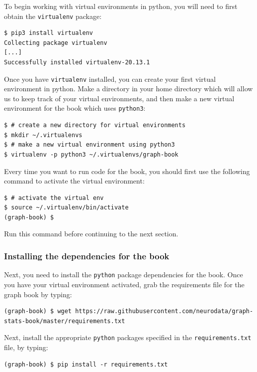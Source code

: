 To begin working with virtual environments in python, you will need to first obtain the \texttt{virtualenv} package:

\begin{lstlisting}[style=bash]
$ pip3 install virtualenv
Collecting package virtualenv
[...]
Successfully installed virtualenv-20.13.1
\end{lstlisting}

Once you have \texttt{virtualenv} installed, you can create your first virtual environment in python. Make a directory in your home directory which will allow us to keep track of your virtual environments, and then make a new virtual environment for the book which uses \texttt{python3}:

\begin{lstlisting}[style=bash]
$ # create a new directory for virtual environments
$ mkdir ~/.virtualenvs
$ # make a new virtual environment using python3
$ virtualenv -p python3 ~/.virtualenvs/graph-book
\end{lstlisting}

Every time you want to run code for the book, you should first use the following command to activate the virtual environment:

\begin{lstlisting}[style=bash]
$ # activate the virtual env
$ source ~/.virtualenv/bin/activate
(graph-book) $ 
\end{lstlisting}

Run this command before continuing to the next section.

\subsubsection*{Installing the dependencies for the book}

Next, you need to install the \texttt{python} package dependencies for the book. Once you have your virtual environment activated, grab the requirements file for the graph book by typing:


\begin{lstlisting}[style=bash]
(graph-book) $ wget https://raw.githubusercontent.com/neurodata/graph-stats-book/master/requirements.txt
\end{lstlisting}

Next, install the appropriate \texttt{python} packages specified in the \texttt{requirements.txt} file, by typing:

\begin{lstlisting}[style=bash]
(graph-book) $ pip install -r requirements.txt
\end{lstlisting}

